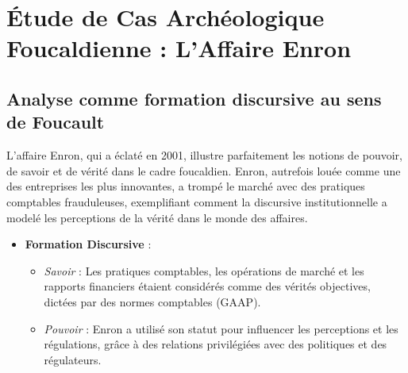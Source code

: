 \documentclass{article}
\begin{document}
\section{Étude de Cas Archéologique Foucaldienne : L'Affaire Enron}

\subsection{Analyse comme formation discursive au sens de Foucault}
L'affaire Enron, qui a éclaté en 2001, illustre parfaitement les notions de pouvoir, de savoir et de vérité dans le cadre foucaldien. Enron, autrefois louée comme une des entreprises les plus innovantes, a trompé le marché avec des pratiques comptables frauduleuses, exemplifiant comment la discursive institutionnelle a modelé les perceptions de la vérité dans le monde des affaires.

\begin{itemize}
    \item \textbf{Formation Discursive} :
    \begin{itemize}
        \item \textit{Savoir} : Les pratiques comptables, les opérations de marché et les rapports financiers étaient considérés comme des vérités objectives, dictées par des normes comptables (GAAP).
        \item \textit{Pouvoir} : Enron a utilisé son statut pour influencer les perceptions et les régulations, grâce à des relations privilégiées avec des politiques et des régulateurs.
    \end{itemize}
\end{itemize}
\end{document}
